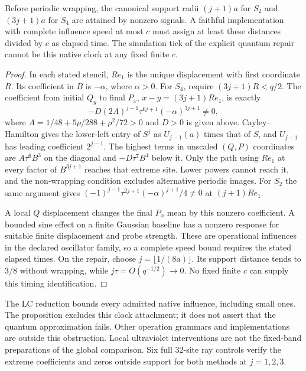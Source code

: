 \begin{proposition}
\label{prop:m1-split-clock-obstruction}
Before periodic wrapping, the canonical support radii $(j+1)a$ for $S_2$
and $(3j+1)a$ for $S_4$ are attained by nonzero signals. A faithful
implementation with complete influence speed at most $c$ must assign at
least these distances divided by $c$ as elapsed time. The simulation tick of the
explicit quantum repair cannot be this native clock at any fixed finite $c$.
\end{proposition}
\begin{proof}
In each stated stencil, $Re_1$ is the unique displacement with first
coordinate $R$. Its coefficient in $B$ is $-\alpha$, where $\alpha>0$.
For $S_4$, require $(3j+1)R<q/2$. The coefficient from initial $Q_y$ to
final $P_x$, $x-y=(3j+1)Re_1$, is exactly
\[
 -D(2A)^{j-1}\tau^{6j+1}(-\alpha)^{3j+1}\ne0,
\]
where $A=1/48+5\rho/288+\rho^2/72>0$ and $D>0$ is given above.
Cayley--Hamilton gives the lower-left entry of $S^j$ as
$U_{j-1}(a)$ times that of $S$, and $U_{j-1}$ has leading coefficient
$2^{j-1}$. The highest terms in unscaled $(Q,P)$ coordinates are
$A\tau^6B^3$ on the diagonal and $-D\tau^7B^4$ below it.
Only the path using $Re_1$ at every factor of $B^{3j+1}$ reaches that
extreme site. Lower powers cannot reach it, and the non-wrapping condition
excludes alternative periodic images. For $S_2$ the same argument gives
$(-1)^{j-1}\tau^{2j+1}(-\alpha)^{j+1}/4\ne0$ at $(j+1)Re_1$.

A local $Q$ displacement changes the final $P_x$ mean by this nonzero
coefficient. A bounded sine effect on a finite Gaussian baseline has a
nonzero response for suitable finite displacement and probe strength.
These are operational influences in the declared oscillator family, so a
complete speed bound requires the stated elapsed times. On the repair,
choose $j=\lfloor1/(8a)\rfloor$. Its support distance tends to $3/8$
without wrapping, while $j\tau=O(q^{-1/2})\to0$. No fixed finite $c$
can supply this timing identification.
\end{proof}

The LC reduction bounds every admitted native influence, including small
ones. The proposition excludes this clock attachment; it does not assert
that the quantum approximation fails. Other operation grammars and
implementations are outside this obstruction. Local ultraviolet interventions are
not the fixed-band preparations of the global comparison. Six full 32-site
ray controls verify the extreme coefficients and zeros outside support for
both methods at $j=1,2,3$.

